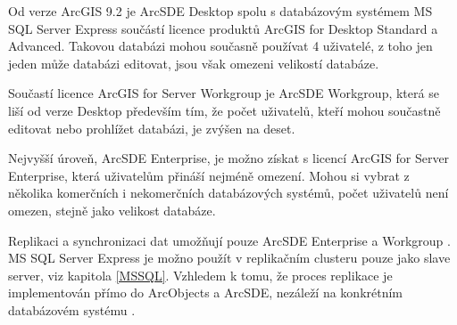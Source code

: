 Od verze ArcGIS 9.2 je ArcSDE Desktop spolu s databázovým systémem MS SQL Server
Express součástí licence produktů ArcGIS for Desktop Standard a Advanced.
Takovou databázi mohou současně používat 4 uživatelé, z toho jen jeden může
databázi editovat, jsou však omezeni velikostí databáze.

Součastí licence ArcGIS for Server Workgroup je ArcSDE Workgroup, která se liší
od verze Desktop především tím, že počet uživatelů, kteří mohou součastně
editovat nebo prohlížet databázi, je zvýšen na deset.

Nejvyšší úroveň, ArcSDE Enterprise, je možno získat s licencí ArcGIS for Server
Enterprise, která uživatelům přináší nejméně omezení. Mohou si vybrat z
několika komerčních i nekomerčních databázových systémů, počet uživatelů není
omezen, stejně jako velikost databáze.

Replikaci a synchronizaci dat umožňují pouze ArcSDE Enterprise a Workgroup
\citep{Esri2013b}. MS SQL Server Express je možno použít v replikačním clusteru
pouze jako slave server, viz kapitola \ref{MSSQL}. Vzhledem k tomu,
že proces replikace je implementován přímo do ArcObjects a ArcSDE, nezáleží na
konkrétním databázovém systému \citep{Law2008}.
